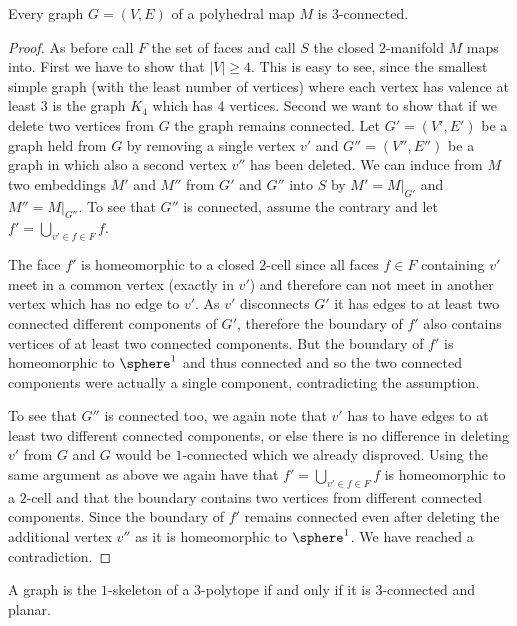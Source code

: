 \begin{proposition} Every graph $G = (V, E)$ of a polyhedral map $M$ is $3$-connected.
  \begin{proof}
    As before call $F$ the set of faces and call $S$ the closed $2$-manifold $M$ maps into. First we have to show that $|V| \geq 4$. This is easy to see, since the smallest simple graph (with the least number of vertices) where each vertex has valence at least $3$ is the graph $K_4$ which has $4$ vertices. Second we want to show that if we delete two vertices from $G$ the graph remains connected. Let $G' = (V', E')$ be a graph held from $G$ by removing a single vertex $v'$ and $G'' = (V'', E'')$ be a graph in which also a second vertex $v''$ has been deleted. We can induce from $M$ two embeddings $M'$ and $M''$ from $G'$ and $G''$ into $S$ by $M' = M|_{G'}$ and $M'' = M|_{G''}$. To see that $G''$ is connected, assume the contrary and let $f' = \bigcup_{v' \in f \in F} f$.

The face $f'$ is homeomorphic to a closed $2$-cell since all faces $f \in F$ containing $v'$ meet in a common vertex (exactly in $v'$) and therefore can not meet in another vertex which has no edge to $v'$. As $v'$ disconnects $G'$ it has edges to at least two connected different components of $G'$, therefore the boundary of $f'$ also contains vertices of at least two connected components. But the boundary of $f'$ is homeomorphic to $\sphere^1$ and thus connected and so the two connected components were actually a single component, contradicting the assumption.

To see that $G''$ is connected too, we again note that $v'$ has to have edges to at least two different connected components, or else there is no difference in deleting $v'$ from $G$ and $G$ would be $1$-connected which we already disproved. Using the same argument as above we again have that $f' = \bigcup_{v' \in f \in F} f$ is homeomorphic to a $2$-cell and that the boundary contains two vertices from different connected components. Since the boundary of $f'$ remains connected even after deleting the additional vertex $v''$ as it is homeomorphic to $\sphere^1$. We have reached a contradiction.
  \end{proof}
\end{proposition}

\begin{theorem} A graph is the $1$-skeleton of a $3$-polytope if and only if it is $3$-connected and planar.
\end{theorem}

